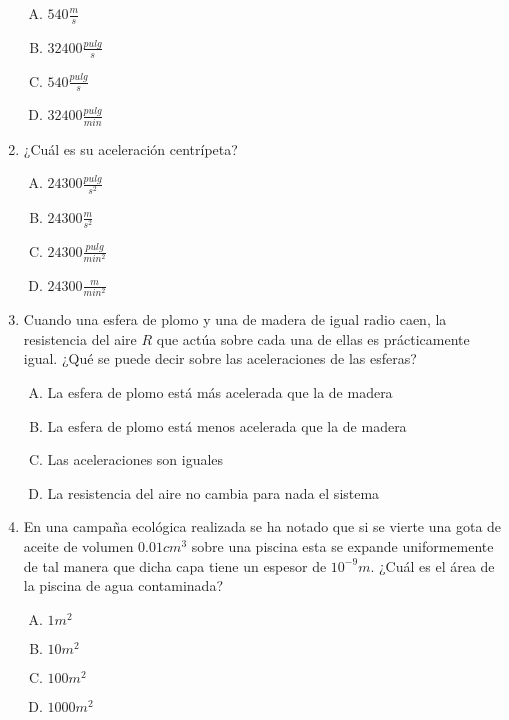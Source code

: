 \begin{enumerate}
\begin{enumerate}[(A)]
\item $540\frac{m}{s}$
\item $32400\frac{pulg}{s}$
\item $540\frac{pulg}{s}$
\item $32400\frac{pulg}{min}$
\end{enumerate}


\item ¿Cuál es su aceleración centrípeta?\label{dia-9}

\begin{enumerate}[(A)]
\item $24300\frac{pulg}{s^2}$
\item $24300\frac{m}{s^2}$
\item $24300\frac{pulg}{min^2}$
\item $24300\frac{m}{min^2}$
\end{enumerate}

\item Cuando una esfera de plomo y una de madera de igual radio caen, la resistencia del aire $R$ que actúa sobre cada una de ellas es prácticamente igual. ¿Qu\'e se puede decir sobre las aceleraciones de las esferas?\label{dia-10}

\begin{enumerate}[(A)]
\item La esfera de plomo está más acelerada que la de madera
\item La esfera de plomo está menos acelerada que la de madera
\item Las aceleraciones son iguales
\item La resistencia del aire no cambia para nada el sistema
\end{enumerate}

\item En una campaña ecológica realizada se ha notado que si se vierte una gota de aceite de volumen $0.01cm^3$ sobre una piscina esta se expande uniformemente de tal manera que dicha capa tiene un espesor de $10^{-9}m$. ¿Cuál es el área de la piscina de agua contaminada?\label{dia-11}

\begin{enumerate}[(A)]
\item $1m^2$
\item $10m^2$
\item $100m^2$
\item $1000m^2$
\end{enumerate}


\end{enumerate}
